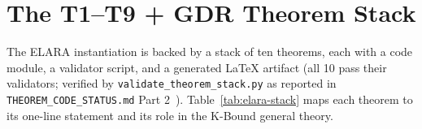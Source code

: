\section{The T1--T9 + GDR Theorem Stack}\label{sec:elara-theorems}

The ELARA instantiation is backed by a stack of ten theorems, each with a code
module, a validator script, and a generated \LaTeX{} artifact (all 10 pass their
validators; verified by \texttt{validate\_theorem\_stack.py} as reported in
\texttt{THEOREM\_CODE\_STATUS.md} Part 2~\cite{kbound2026repo}).  Table~\ref{tab:elara-stack}
maps each theorem to its one-line statement and its role in the K-Bound general theory.

